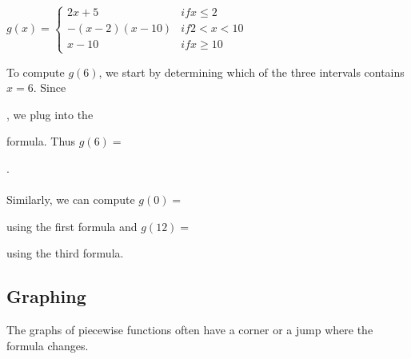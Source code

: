 \documentclass{ximera}
\begin{document}
\begin{example}
$g(x)=\begin{cases} 2x+5 & \textit{if}x\leq 2\\ -(x-2)(x-10) & \textit{if} 2<x<10\\ x-10 & \textit{if} x\geq 10\end{cases}$

To compute $g(6)$, we start by determining which of the three intervals contains $x=6$. Since 
\begin{multipleChoice}
  \end{multipleChoice}
  , we plug into the 
  \begin{multipleChoice}
  \end{multipleChoice}
formula. Thus $g(6)=$
\begin{multipleChoice}
  \end{multipleChoice}.\\
\\Similarly, we can compute $g(0)=$
\begin{multipleChoice}
  \end{multipleChoice} using the first formula and $g(12)=$ 
  \begin{multipleChoice}
  \end{multipleChoice}using the third formula.
\end{example}



\subsection*{Graphing}
The graphs of piecewise functions often have a corner or a jump where the formula changes. 
\end{document}
